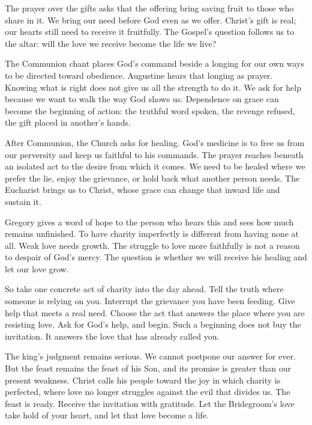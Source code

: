The prayer over the gifts asks that the offering bring saving
fruit to those who share in it. We bring our need before God
even as we offer. Christ's gift is real; our hearts still need
to receive it fruitfully. The Gospel's question follows us to
the altar: will the love we receive become the life we live?

The Communion chant places God's command beside a longing for
our own ways to be directed toward obedience. Augustine hears
that longing as prayer. Knowing what is right does not give us
all the strength to do it. We ask for help because we want to
walk the way God shows us. Dependence on grace can become the
beginning of action: the truthful word spoken, the revenge
refused, the gift placed in another's hands.

After Communion, the Church asks for healing. God's medicine
is to free us from our perversity and keep us faithful to his
commands. The prayer reaches beneath an isolated act to the
desire from which it comes. We need to be healed where we
prefer the lie, enjoy the grievance, or hold back what another
person needs. The Eucharist brings us to Christ, whose grace
can change that inward life and sustain it.

Gregory gives a word of hope to the person who hears this and
sees how much remains unfinished. To have charity imperfectly
is different from having none at all. Weak love needs growth.
The struggle to love more faithfully is not a reason to despair
of God's mercy. The question is whether we will receive his
healing and let our love grow.

So take one concrete act of charity into the day ahead. Tell
the truth where someone is relying on you. Interrupt the
grievance you have been feeding. Give help that meets a real
need. Choose the act that answers the place where you are
resisting love. Ask for God's help, and begin. Such a beginning
does not buy the invitation. It answers the love that has
already called you.

The king's judgment remains serious. We cannot postpone our
answer for ever. But the feast remains the feast of his Son,
and its promise is greater than our present weakness. Christ
calls his people toward the joy in which charity is perfected,
where love no longer struggles against the evil that divides us.
The feast is ready. Receive the invitation with gratitude.
Let the Bridegroom's love take hold of your heart, and let
that love become a life.
